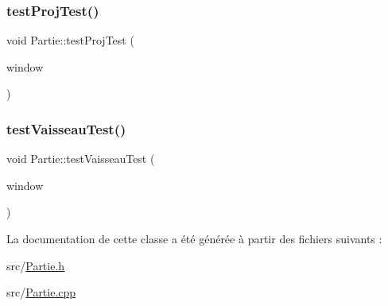 \subsubsection{\texorpdfstring{test\+Proj\+Test()}{testProjTest()}}
{\footnotesize\ttfamily void Partie\+::test\+Proj\+Test (\begin{DoxyParamCaption}\item[{sf\+::\+Render\+Window \&}]{window }\end{DoxyParamCaption})}

\mbox{\label{class_partie_ae1876425c48ff2c9426b3971309f29c3}} 
\subsubsection{\texorpdfstring{test\+Vaisseau\+Test()}{testVaisseauTest()}}
{\footnotesize\ttfamily void Partie\+::test\+Vaisseau\+Test (\begin{DoxyParamCaption}\item[{sf\+::\+Render\+Window \&}]{window }\end{DoxyParamCaption})}



La documentation de cette classe a été générée à partir des fichiers suivants \+:\begin{DoxyCompactItemize}
\item 
src/\hyperlink{_partie_8h}{Partie.\+h}\item 
src/\hyperlink{_partie_8cpp}{Partie.\+cpp}\end{DoxyCompactItemize}
